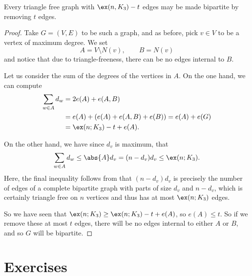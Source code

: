 \documentclass[nobib]{tufte-handout}
\begin{document}
\begin{theorem}
    Every triangle free graph with $\ex(n, K_3) - t$ edges may be made bipartite by removing $t$ edges.

    \begin{proof}
        Take $G = (V,E)$ to be such a graph, and as before, pick $v \in V$ to be a vertex of maximum degree. We set
        $$A = V \setminus N(v), \qquad B = N(v)$$
        and notice that due to triangle-freeness, there can be no edges internal to $B$.

        Let us consider the sum of the degrees of the vertices in $A$. On the one hand, we can compute
        \begin{align*}
            \sum_{w \in A} d_w &= 2e(A) + e(A,B)\\
            &= e(A) + \left(e(A) + e(A,B) + e(B)\right) = e(A) + e(G)\\
            &= \ex(n; K_3) - t + e(A).
        \end{align*}

        On the other hand, we have since $d_v$ is maximum, that
        \begin{align*}
            \sum_{w \in A} d_w \leq \abs{A}d_v = (n-d_v)d_v \leq \ex(n; K_3).
        \end{align*}
        Here, the final inequality follows from that $(n-d_v)d_v$ is precisely the number of edges of a complete bipartite graph with parts of size $d_v$ and $n-d_v$, which is certainly triangle free on $n$ vertices and thus has at most $\ex(n; K_3)$ edges.

        So we have seen that $\ex(n; K_3) \geq \ex(n; K_3) - t + e(A)$, so $e(A) \leq t$. So if we remove these at most $t$ edges, there will be no edges internal to either $A$ or $B$, and so $G$ will be bipartite.
    \end{proof}
\end{theorem}

\section{Exercises}


%
%
\end{document}
